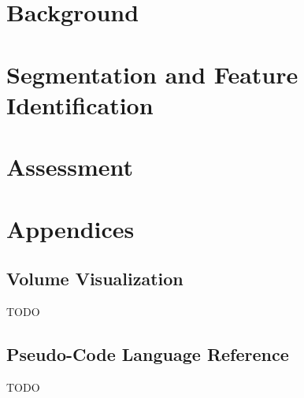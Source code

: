 \documentclass{smgthesis}
\begin{document}
\pagestyle{empty}


\doublespacing								%




\onehalfspacing								%

\tableofcontents
\listoffigures
{}


\doublespacing								%
\dropchapter{-2cm}						%



\part{Background}

\pagestyle{fancy}
\setlength{\headheight}{15pt}
\fancyhead{}
\fancyhead[R]{\slshape \leftmark}





\part{Segmentation and Feature Identification}





\part{Assessment}





\appendix

\dropchapter{-2cm}

\part{Appendices}




\chapter{Volume Visualization} TODO
\chapter{Pseudo-Code Language Reference} TODO

\printindex


\end{document}
